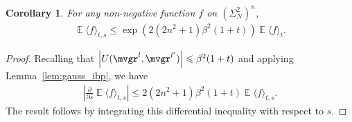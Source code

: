 \documentclass[letterpaper,11pt,reqno]{amsart}
\newtheorem{cor}[thm]{Corollary}
\renewcommand{\leq}{\leqslant}
\newcommand{\ra}{\rangle}
\newcommand{\la}{\langle}
\newcommand{\abs}[1]{\left\vert#1\right\vert}
\DeclareMathOperator{\E}{\mathds{E}}
\begin{document}
\begin{cor} \label{lem:t,s<t,1}
    For any non-negative function \(f\) on \((\Sigma_{N}^2)^n\),
    \begin{align*}
    \E \la f \ra_{t,s} \leq \exp(2(2n^2 +1) \beta^2(1+t)) \E \la f \ra_{t}.
    \end{align*}
\end{cor}
\begin{proof}
    Recalling that \(\abs{U(\mvgr^l, \mvgr^{l'})} \leq \beta^2 (1+t)\) and applying Lemma~\ref{lem:gauss_ibp}, we have
    \begin{align*}\abs{\frac{\partial}{\partial s} \E \la f \ra_{t,s} }\leq 2(2n^2 +1) \beta^2(1+t) \E \la f \ra_{t,s}.\end{align*}
    The result follows by integrating this differential inequality with respect to \(s\).
\end{proof}
\end{document}
